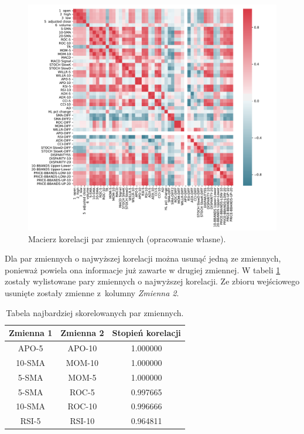\documentclass[a4paper, twoside, 11pt, openright]{article}
\begin{document}
\begin{figure}[H]
\centering 
\includegraphics[scale=0.6]{img/corr_matrix.pdf}
\caption{Macierz korelacji par zmiennych (opracowanie własne).}
\label{img:correlation}
\end{figure}

Dla par zmiennych o najwyższej korelacji można usunąć jedną ze zmiennych, ponieważ powiela ona informacje już zawarte w drugiej zmiennej.  W tabeli \ref{tab:ccorr_table1} zostały wylistowane pary zmiennych o najwyższej korelacji. Ze zbioru wejściowego usunięte zostały zmienne z~kolumny \textit{Zmienna 2}.


\begin{table}[H]
\centering
\begin{tabular}{ |c|c|c| } 
 \hline
Zmienna 1 & Zmienna 2 &  Stopień korelacji \\
 \hline
APO-5 & APO-10 &  1.000000 \\
 \hline
10-SMA & MOM-10 &  1.000000 \\
 \hline
5-SMA & MOM-5 &  1.000000 \\
 \hline
5-SMA & ROC-5 &  0.997665 \\
 \hline
10-SMA & ROC-10 &  0.996666 \\
 \hline
RSI-5 & RSI-10 &  0.964811 \\  
 \hline
\end{tabular}
\caption{Tabela najbardziej skorelowanych par zmiennych.}
\label{tab:ccorr_table1}
\end{table}
\end{document}
